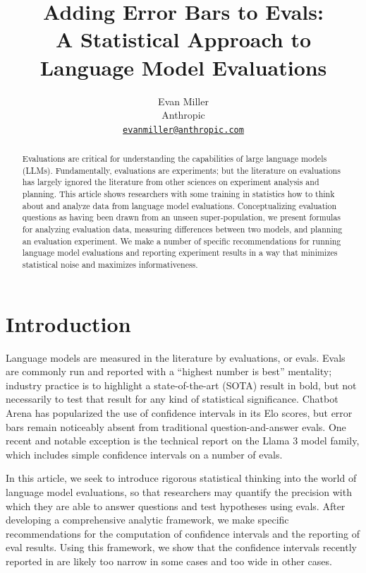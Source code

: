 \documentclass[11pt, oneside]{article}   	%
\title{Adding Error Bars to Evals: \\ A Statistical Approach to Language Model Evaluations}
\author{Evan Miller \\ Anthropic \\ \href{mailto:evanmiller@anthropic.com}{\texttt{evanmiller@anthropic.com}}}
\begin{document}
\maketitle

\begin{abstract}
Evaluations are critical for understanding the capabilities of large language models (LLMs). Fundamentally, evaluations are experiments; but the literature on evaluations has largely ignored the literature from other sciences on experiment analysis and planning. This article shows researchers with some training in statistics how to think about and analyze data from language model evaluations. Conceptualizing evaluation questions as having been drawn from an unseen super-population, we present formulas for analyzing evaluation data, measuring differences between two models, and planning an evaluation experiment. We make a number of specific recommendations for running language model evaluations and reporting experiment results in a way that minimizes statistical noise and maximizes informativeness.
\end{abstract}

\section{Introduction}
\label{introduction}

Language models are measured in the literature by evaluations, or evals. Evals are commonly run and reported with a ``highest number is best'' mentality; industry practice is to highlight a state-of-the-art (SOTA) result in bold, but not necessarily to test that result for any kind of statistical significance.\cite{madaan2024quantifyingvarianceevaluationbenchmarks} Chatbot Arena\cite{chiang2024chatbot} has popularized the use of confidence intervals in its Elo scores, but error bars remain noticeably absent from traditional question-and-answer evals. One recent and notable exception is the technical report on the Llama 3 model family\cite{dubey2024llama3herdmodels}, which includes simple confidence intervals on a number of evals.

In this article, we seek to introduce rigorous statistical thinking into the world of language model evaluations, so that researchers may quantify the precision with which they are able to answer questions and test hypotheses using evals. After developing a comprehensive analytic framework, we make specific recommendations for the computation of confidence intervals and the reporting of eval results. Using this framework, we show that the confidence intervals recently reported in \cite{dubey2024llama3herdmodels} are likely too narrow in some cases and too wide in other cases.
\end{document}
